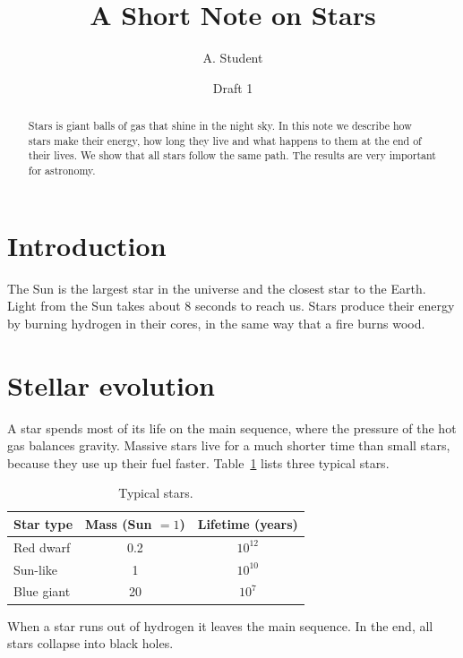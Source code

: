 \documentclass[11pt]{article}
\title{A Short Note on Stars}
\author{A. Student}
\date{Draft 1}
\begin{document}
\maketitle

\begin{abstract}
Stars is giant balls of gas that shine in the night sky. In this note we describe
how stars make their energy, how long they live and what happens to them at the end
of their lives. We show that all stars follow the same path. The results are very
important for astronomy.
\end{abstract}

\section{Introduction}

The Sun is the largest star in the universe and the closest star to the Earth.
Light from the Sun takes about 8 seconds to reach us. Stars produce their energy by
burning hydrogen in their cores, in the same way that a fire burns wood.

\section{Stellar evolution}

A star spends most of its life on the main sequence, where the pressure of the hot
gas balances gravity. Massive stars live for a much shorter time than small stars,
because they use up their fuel faster. Table~\ref{tab:stars} lists three typical
stars.

\begin{table}[h]
\centering
\caption{Typical stars.}
\label{tab:stars}
\begin{tabular}{lcc}
\toprule
Star type & Mass (Sun $=1$) & Lifetime (years) \\
\midrule
Red dwarf   & 0.2 & $10^{12}$ \\
Sun-like    & 1   & $10^{10}$ \\
Blue giant  & 20  & $10^{7}$ \\
\bottomrule
\end{tabular}
\end{table}

When a star runs out of hydrogen it leaves the main sequence. In the end, all stars
collapse into black holes.
\end{document}
